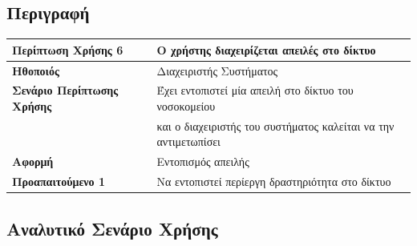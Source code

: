 \documentclass{article}
\newcommand\T{\rule{0pt}{2.6ex}}       %
\newcommand\B{\rule[-1.2ex]{0pt}{0pt}}
\begin{document}
\subsection{Περιγραφή}

\begin{center}
     \begin{tabular}{|l|l|}
     \hline
      \textbf{Περίπτωση Χρήσης 6} & Ο χρήστης διαχειρίζεται απειλές στο δίκτυο \T\B \\ 
      \hline
      \textbf{Ηθοποιός} & Διαχειριστής Συστήματος \T\B \\
      \hline
      \textbf{Σενάριο Περίπτωσης Χρήσης} & Έχει εντοπιστεί μία απειλή στο δίκτυο του νοσοκομείου \T \\& και ο διαχειριστής του συστήματος καλείται να την αντιμετωπίσει \B \\
      \hline
      \textbf{Αφορμή} & Εντοπισμός απειλής \T\B \\
      \hline
      \textbf{Προαπαιτούμενο 1} & Να εντοπιστεί περίεργη δραστηριότητα στο δίκτυο \T\B \\
      \hline
     \end{tabular}
 \end{center}

\newpage

\subsection{Αναλυτικό Σενάριο Χρήσης}
\end{document}
